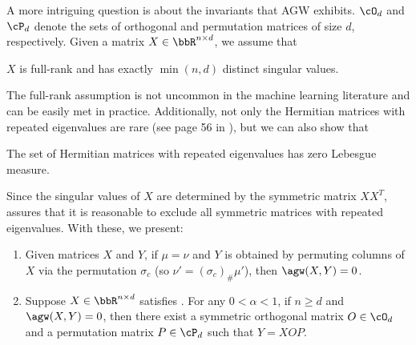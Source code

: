 A more intriguing question is about the invariants that AGW exhibits.
$\cO_d$ and $\cP_d$ denote the sets of orthogonal and permutation matrices of size $d$,
respectively. Given a matrix $X \in \bbR^{n \times d}$, we assume that
\begin{assumption}
    \label{assumption:1}
    $X$ is full-rank and has exactly $\min(n, d)$ distinct singular values.
\end{assumption}
The full-rank assumption is not uncommon in the machine learning literature \citep{Kenji19}
and can be easily met in practice. Additionally,
not only the Hermitian matrices with repeated eigenvalues are rare (see page 56 in \citep{Tao12}),
but we can also show that
\begin{corollary}
\label{corr:hermitian}
    The set of Hermitian matrices with repeated eigenvalues has zero Lebesgue measure.
\end{corollary}
Since the singular values of $X$ are determined by the symmetric matrix $X X^T$,
 assures that it is reasonable to exclude all symmetric matrices
with repeated eigenvalues. With these, we present:
\begin{theorem}
\label{thm:invariant}
\text{ }
\begin{enumerate}
    \item Given matrices $X$ and $Y$, if $\mu = \nu$ and $Y$ is obtained by permuting columns of
    $X$ via the permutation $\sigma_c$ (so $\nu' = (\sigma_c)_{\#} \mu'$),
    then $\agw(X, Y) = 0$.
    \item Suppose $X \in \bbR^{n \times d}$ satisfies .
    For any $0 < \alpha < 1$, if $n \geq d$ and $\agw(X, Y) = 0$,
    then there exist a symmetric orthogonal matrix $O \in \cO_d$ and
    a permutation matrix $P \in \cP_d$ such that $Y = X OP$.
\end{enumerate}
\end{theorem}
